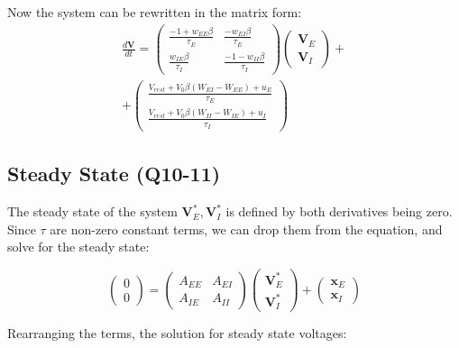 \documentclass[10pt,twocolumn]{article}
\begin{document}
Now the system can be rewritten in the matrix form:
$$
    \begin{align*}
        \frac{d\textbf{V}}{dt}
        =
        \begin{pmatrix}
            \frac{-1 + w_{EE}\beta}{\tau_E} & \frac{-w_{EI}\beta}{\tau_E}     \\
            \frac{w_{IE}\beta}{\tau_I}      & \frac{-1 - w_{II}\beta}{\tau_I}
        \end{pmatrix}
        \begin{pmatrix}
            \textbf{V}_E \\ \textbf{V}_I
        \end{pmatrix}+
        \\
        +
        \begin{pmatrix}
            \frac{V_{rest} + V_0\beta(W_{EI}-W_{EE}) + u_E}{\tau_E} \\
            \frac{V_{rest} + V_0\beta(W_{II}-W_{IE}) + u_I}{\tau_I}
        \end{pmatrix}
    \end{align*}
$$


\subsection{Steady State (Q10-11)}
The steady state of the system $\textbf{V}^\ast_E,\textbf{V}^\ast_I$ is defined  by
both derivatives being zero. Since $\tau$ are non-zero constant terms, we can drop
them from the equation, and solve for the steady state:

$$
    \begin{pmatrix}
        0 \\ 0
    \end{pmatrix}
    =
    \begin{pmatrix}
        A_{EE} & A_{EI} \\
        A_{IE} & A_{II}
    \end{pmatrix}
    \begin{pmatrix}
        \textbf{V}^\ast_E \\ \textbf{V}^\ast_I
    \end{pmatrix}+
    \begin{pmatrix}
        \textbf{x}_E \\ \textbf{x}_I
    \end{pmatrix}
$$

Rearranging the terms, the solution for steady state voltages:
\end{document}
